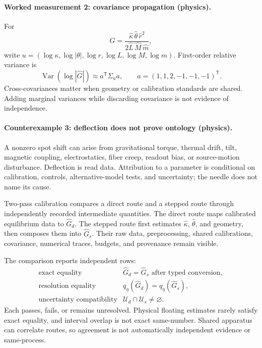 \paragraph{Worked measurement 2: covariance propagation (physics).}
For
\[
\widehat G=\frac{\widehat\kappa\,\widehat\theta\,\widehat r^2}
{2\widehat L\,\widehat M\,\widehat m},
\]
write \(u=(\log\kappa,\log|\theta|,\log r,\log L,\log M,\log m)\).  First-order relative variance is
\[
\operatorname{Var}(\log|\widehat G|)
\approx a^{\mathsf T}\Sigma_u a,\qquad a=(1,1,2,-1,-1,-1)^{\mathsf T}.
\]
Cross-covariances matter when geometry or calibration standards are shared.  Adding marginal variances while
discarding covariance is not evidence of independence.

\paragraph{Counterexample 3: deflection does not prove ontology (physics).}
A nonzero spot shift can arise from gravitational torque, thermal drift, tilt, magnetic coupling, electrostatics,
fiber creep, readout bias, or source-motion disturbance.  Deflection is read data.  Attribution to a parameter is
conditional on calibration, controls, alternative-model tests, and uncertainty; the needle does not name its cause.

Two-pass calibration compares a direct route and a stepped route through independently recorded intermediate
quantities.  The direct route maps calibrated equilibrium data to \(\widehat G_d\).  The stepped route first estimates
\(\widehat\kappa\), \(\widehat\theta\), and geometry, then composes them into \(\widehat G_s\).  Their raw data,
preprocessing, shared calibrations, covariance, numerical traces, budgets, and provenance remain visible.

The comparison reports independent rows:
\[
\begin{array}{ll}
\text{exact equality}&\widehat G_d=\widehat G_s\text{ after typed conversion},\\
\text{resolution equality}&q_\eta(\widehat G_d)=q_\eta(\widehat G_s),\\
\text{uncertainty compatibility}&\mathcal U_d\cap\mathcal U_s\ne\varnothing.
\end{array}
\]
Each passes, fails, or remains unresolved.  Physical floating estimates rarely satisfy exact equality, and interval
overlap is not exact same-number.  Shared apparatus can correlate routes, so agreement is not automatically
independent evidence or same-process.

